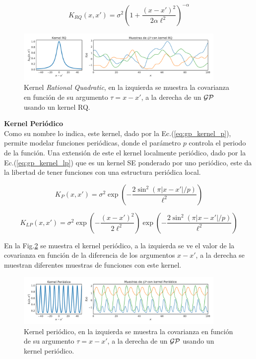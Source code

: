 \begin{equation}\label{eq:gp_kernel_rq}
	K_{RQ}(x, x') = \sigma^2 \left(1 + \frac{\left( x- x'\right)^2}{2\alpha\ell^2 } \right)^{-\alpha}
\end{equation}


\begin{figure}[H]
	\centering
	\includegraphics[width=0.9\textwidth]{img/gp_samples_RQ.pdf}
	\caption{Kernel \textit{Rational Quadratic}, en la izquierda se muestra la covarianza en función de su argumento $\tau=x-x'$, a la derecha de un $\mathcal{GP}$ usando un kernel RQ.}
	\label{fig:gp_6}
\end{figure}

\textbf{Kernel Periódico}\\

Como su nombre lo indica, este kernel, dado por la Ec.(\ref{eq:gp_kernel_p}), permite modelar funciones periódicas, donde el parámetro $p$ controla el periodo de la función. Una extensión de este el kernel localmente periódico, dado por la Ec.(\ref{eq:gp_kernel_lp}) que es un kernel SE ponderado por uno periódico, este da la libertad de tener funciones con una estructura periódica local.


\begin{equation}\label{eq:gp_kernel_p}
	K_{P}(x, x') = \sigma^2 \exp\left(-\frac{2\sin^2\left(\pi |x- x'| / p \right)}{\ell^2 } \right)
\end{equation}

\begin{equation}\label{eq:gp_kernel_lp}
	K_{LP}(x, x') = \sigma^2  \exp\left(-\frac{\left(x- x' \right)^2}{2\ell^2 } \right) \exp\left(-\frac{2\sin^2\left(\pi |x- x'| / p \right)}{\ell^2 } \right)
\end{equation}

En la Fig.\ref{fig:gp_7} se muestra el kernel periódico, a la izquierda se ve el valor de la covarianza en función de la diferencia de los argumentos $x-x'$, a la derecha se muestran diferentes muestras de funciones con este kernel.

\begin{figure}[H]
	\centering
	\includegraphics[width=0.9\textwidth]{img/gp_samples_P.pdf}
	\caption{Kernel periódico, en la izquierda se muestra la covarianza en función de su argumento $\tau=x-x'$, a la derecha de un $\mathcal{GP}$ usando un kernel periódico.}
	\label{fig:gp_7}
\end{figure}

